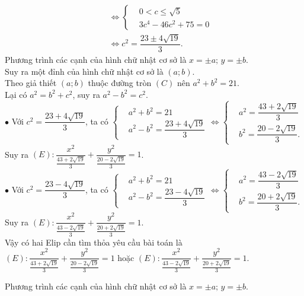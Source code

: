 \begin{bt}
{\begin{listEX}
\begin{eqnarray*}
			&& \Leftrightarrow \left\{\begin{aligned}
						&0<c\leq \sqrt{5}\\
						&3c^4-46c^2+75=0
						\end{aligned}\right.\\
			&&\Leftrightarrow c^2=\dfrac{23\pm 4\sqrt{19}}{3}.
		\end{eqnarray*}
		Phương trình các cạnh của hình chữ nhật cơ sở là $x=\pm a;\, y=\pm b$.\\
		Suy ra một đỉnh của hình chữ nhật cơ sở là $(a;b)$.\\
		Theo giả thiết $(a;b)$ thuộc đường tròn $(C)$ nên $a^2+b^2=21$.\\
		Lại có $a^2=b^2+c^2$, suy ra $a^2-b^2=c^2$.\\
		$\bullet$ Với $c^2=\dfrac{23+4\sqrt{19}}{3}$, ta có $\left\{\begin{aligned}
		&a^2+b^2=21\\
		&a^2-b^2=\dfrac{23+4\sqrt{19}}{3}
		\end{aligned}\right. \Leftrightarrow \left\{\begin{aligned}
		&a^2=\dfrac{43+2\sqrt{19}}{3}\\
		&b^2=\dfrac{20-2\sqrt{19}}{3}.
		\end{aligned}\right. $\\
		Suy ra $(E)\colon \dfrac{x^2}{\frac{43+2\sqrt{19}}{3}}+\dfrac{y^2}{\frac{20-2\sqrt{19}}{3}}=1$.\\
		$\bullet$ Với $c^2=\dfrac{23-4\sqrt{19}}{3}$, ta có $\left\{\begin{aligned}
		&a^2+b^2=21\\
		&a^2-b^2=\dfrac{23-4\sqrt{19}}{3}
		\end{aligned}\right. \Leftrightarrow \left\{\begin{aligned}
		&a^2=\dfrac{43-2\sqrt{19}}{3}\\
		&b^2=\dfrac{20+2\sqrt{19}}{3}.
		\end{aligned}\right. $\\
		Suy ra $(E)\colon \dfrac{x^2}{\tfrac{43-2\sqrt{19}}{3}}+\dfrac{y^2}{\tfrac{20+2\sqrt{19}}{3}}=1$.\\
		Vậy có hai Elip cần tìm thỏa yêu cầu bài toán là\\
		$(E)\colon \dfrac{x^2}{\tfrac{43+2\sqrt{19}}{3}}+\dfrac{y^2}{\tfrac{20-2\sqrt{19}}{3}}=1$ hoặc $(E)\colon \dfrac{x^2}{\tfrac{43-2\sqrt{19}}{3}}+\dfrac{y^2}{\tfrac{20+2\sqrt{19}}{3}}=1$.
		\item Phương trình các cạnh của hình chữ nhật cơ sở là $x=\pm a;\, y=\pm b$.\\

\end{listEX}}
\end{bt}
